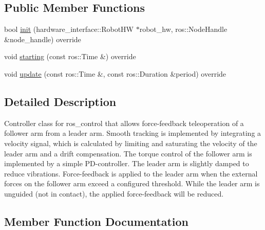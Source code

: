 \subsection*{Public Member Functions}
\begin{DoxyCompactItemize}
\item 
bool \hyperlink{classfranka__example__controllers_1_1_teleop_joint_p_d_example_controller_ae70228e8a3670b6c780ac0f1a986f411}{init} (hardware\+\_\+interface\+::\+Robot\+HW $\ast$robot\+\_\+hw, ros\+::\+Node\+Handle \&node\+\_\+handle) override
\item 
void \hyperlink{classfranka__example__controllers_1_1_teleop_joint_p_d_example_controller_a653ab884c684dbe7bcbfec5dda4e51a0}{starting} (const ros\+::\+Time \&) override
\item 
void \hyperlink{classfranka__example__controllers_1_1_teleop_joint_p_d_example_controller_ab40026839a17b639a2caddd20fd8d90f}{update} (const ros\+::\+Time \&, const ros\+::\+Duration \&period) override
\end{DoxyCompactItemize}


\subsection{Detailed Description}
Controller class for ros\+\_\+control that allows force-\/feedback teleoperation of a follower arm from a leader arm. Smooth tracking is implemented by integrating a velocity signal, which is calculated by limiting and saturating the velocity of the leader arm and a drift compensation. The torque control of the follower arm is implemented by a simple P\+D-\/controller. The leader arm is slightly damped to reduce vibrations. Force-\/feedback is applied to the leader arm when the external forces on the follower arm exceed a configured threshold. While the leader arm is unguided (not in contact), the applied force-\/feedback will be reduced. 

\subsection{Member Function Documentation}
\mbox{\label{classfranka__example__controllers_1_1_teleop_joint_p_d_example_controller_ae70228e8a3670b6c780ac0f1a986f411}} 
